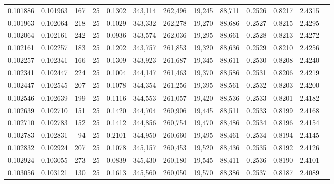 \begin{tabular}{rrrrrrrrrrrrr}
0.101886 & 0.101963 &   167 &  25 &                                     0.1302 & 343,114 & 262,496 &  19,245 &  88,711 & 0.2526 & 0.8217 & 2.4315 \\
0.101963 & 0.102064 &   218 &  25 &                                     0.1029 & 343,332 & 262,278 &  19,270 &  88,686 & 0.2527 & 0.8215 & 2.4295 \\
0.102064 & 0.102161 &   242 &  25 &                                     0.0936 & 343,574 & 262,036 &  19,295 &  88,661 & 0.2528 & 0.8213 & 2.4272 \\
0.102161 & 0.102257 &   183 &  25 &                                     0.1202 & 343,757 & 261,853 &  19,320 &  88,636 & 0.2529 & 0.8210 & 2.4256 \\
0.102257 & 0.102341 &   166 &  25 &                                     0.1309 & 343,923 & 261,687 &  19,345 &  88,611 & 0.2530 & 0.8208 & 2.4240 \\
0.102341 & 0.102447 &   224 &  25 &                                     0.1004 & 344,147 & 261,463 &  19,370 &  88,586 & 0.2531 & 0.8206 & 2.4219 \\
0.102447 & 0.102545 &   207 &  25 &                                     0.1078 & 344,354 & 261,256 &  19,395 &  88,561 & 0.2532 & 0.8203 & 2.4200 \\
0.102546 & 0.102639 &   199 &  25 &                                     0.1116 & 344,553 & 261,057 &  19,420 &  88,536 & 0.2533 & 0.8201 & 2.4182 \\
0.102639 & 0.102710 &   151 &  25 &                                     0.1420 & 344,704 & 260,906 &  19,445 &  88,511 & 0.2533 & 0.8199 & 2.4168 \\
0.102710 & 0.102783 &   152 &  25 &                                     0.1412 & 344,856 & 260,754 &  19,470 &  88,486 & 0.2534 & 0.8196 & 2.4154 \\
0.102783 & 0.102831 &    94 &  25 &                                     0.2101 & 344,950 & 260,660 &  19,495 &  88,461 & 0.2534 & 0.8194 & 2.4145 \\
0.102832 & 0.102924 &   207 &  25 &                                     0.1078 & 345,157 & 260,453 &  19,520 &  88,436 & 0.2535 & 0.8192 & 2.4126 \\
0.102924 & 0.103055 &   273 &  25 &                                     0.0839 & 345,430 & 260,180 &  19,545 &  88,411 & 0.2536 & 0.8190 & 2.4101 \\
0.103056 & 0.103121 &   130 &  25 &                                     0.1613 & 345,560 & 260,050 &  19,570 &  88,386 & 0.2537 & 0.8187 & 2.4089 \\

\end{tabular}
